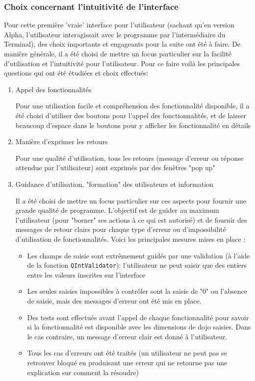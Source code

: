 \subsubsection{Choix concernant l’intuitivité de l’interface}

Pour cette première 'vraie' interface pour l’utilisateur
(sachant qu’en version Alpha, l’utilisateur interagissait avec le programme par l'intermédiaire du Terminal),
des choix importants et engageants pour la suite ont été à faire. De manière générale,
il a été choisi de mettre un focus particulier sur la facilité d’utilisation et l’intuitivité pour l’utilisateur.
Pour ce faire voilà les principales questions qui ont été étudiées et  choix effectués:

\begin{enumerate}
    \item Appel des fonctionnalités

          Pour une utilisation facile et compréhension des fonctionnalité disponible, il a été choisi
          d'utiliser des boutons pour l’appel des fonctionnalités, et de laisser beaucoup d’espace
          dans le boutons pour y afficher les fonctionnalité en détails
    \item Manière d’exprimer les retours

          Pour une qualité d’utilisation, tous les retours (message d’erreur ou réponse attendue par l’utilisateur)
          sont exprimés par des fenêtres "pop up"
    \item Guidance d’utilisation, "formation" des utilisateurs et information

          Il a été choisi de mettre un focus particulier sur ces aspects pour fournir une grande qualité de programme.
          L’objectif est de guider au maximum l’utilisateur (pour "borner" ses actions à ce qui est autorisé) et
          de fournir des messages de retour clairs pour chaque type d’erreur ou d'impossibilité d’utilisation de fonctionnalités.
          Voici les principales mesures mises en place :
          \begin{itemize}
              \item Les champs de saisie sont extrêmement guidés par une validation (à l'aide de la fonction \texttt{QIntValidator}):
                    l’utilisateur ne peut saisir que des entiers entre les valeurs inscrites sur l’interface
              \item Les seules saisies impossibles à contrôler sont la saisie de "0" ou l’absence de saisie, mais des messages d’erreur
                    ont été mis en place.
              \item Des tests sont effectués avant l’appel de chaque fonctionnalité pour savoir si la fonctionnalité est disponible avec
                    les dimensions de dojo saisies. Dans le cas contraire, un message d’erreur clair est donné à l'utilisateur.
              \item Tous les cas d’erreurs ont été traités (un utilisateur ne peut pas se retrouver bloqué en produisant une erreur
                    qui ne retourne pas une explication sur comment la résoudre)
          \end{itemize}

\end{enumerate}
